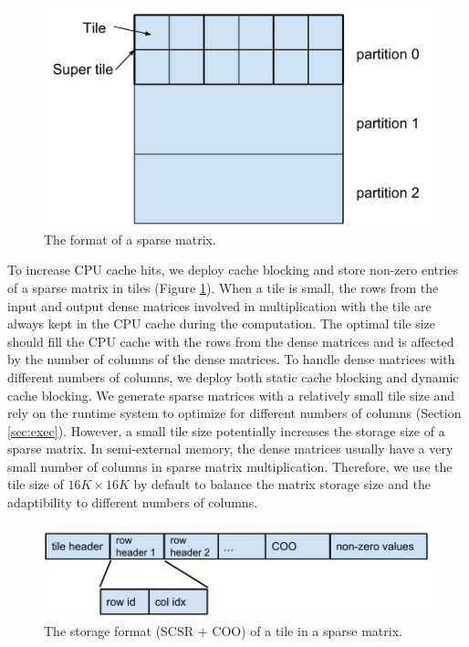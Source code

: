 \begin{figure}
\centering
\includegraphics[scale=0.3]{SpMM_figs/sparse_mat.pdf}
\caption{The format of a sparse matrix.}
\label{sparse_mat}
\end{figure}

To increase CPU cache hits, we deploy cache blocking \cite{Im04} and store
non-zero entries of a sparse matrix in tiles (Figure \ref{sparse_mat}).
When a tile is small, the rows from the input and output dense matrices
involved in multiplication with the tile are always kept in the CPU cache
during the computation. The optimal tile size should fill the CPU cache
with the rows from the dense matrices and is affected by the number of columns
of the dense matrices. To handle dense matrices with different numbers
of columns, we deploy both static cache blocking and dynamic cache blocking.
We generate sparse matrices with a relatively small tile size and
rely on the runtime system
to optimize for different numbers of columns (Section \ref{sec:exec}).
However, a small tile size potentially increases the storage size of a sparse
matrix. In semi-external memory, the dense matrices usually have
a very small number of columns in sparse matrix multiplication. Therefore, we
use the tile size of $16K \times 16K$ by default to balance the matrix storage
size and the adaptibility to different numbers of columns.

\begin{figure}
\centering
\includegraphics[scale=0.5]{SpMM_figs/tile_format.pdf}
\caption{The storage format (SCSR + COO) of a tile in a sparse matrix.}
\label{tile_format}
\end{figure}

